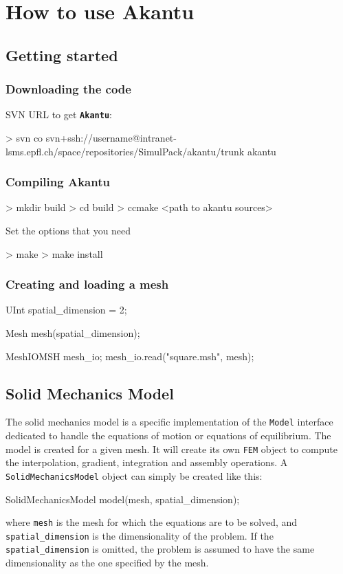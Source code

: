 \documentclass[a4paper,11pt]{book}
\newcommand{\akantu}{{\texttt{\textbf{Akantu}}}\xspace}
\newcommand{\code}[1]{\texttt{#1}}
\begin{document}
\chapter{How to use Akantu}
\section{Getting started}
\subsection{Downloading the code}
SVN URL to get \akantu :
\begin{command}
  > svn co svn+ssh://username@intranet-lsms.epfl.ch/space/repositories/SimulPack/akantu/trunk akantu
\end{command}

\subsection{Compiling Akantu}
\begin{command}
  > mkdir build
  > cd build
  > ccmake <path to akantu sources>
\end{command}

Set the options that you need

\begin{command}
  > make
  > make install
\end{command}

\subsection{Creating and loading a mesh\label{sect:common:mesh}}

\begin{cpp}
  UInt spatial_dimension = 2;

  Mesh mesh(spatial_dimension);

  MeshIOMSH mesh_io;
  mesh_io.read("square.msh", mesh);
\end{cpp}

\section{Solid Mechanics Model}

The  solid mechanics  model is  a  specific implementation  of the  \code{Model}
interface  dedicated  to  handle  the   equations  of  motion  or  equations  of
equilibrium. The  model is  created for a  given mesh.   It will create  its own
\code{FEM}  object  to  compute  the interpolation,  gradient,  integration  and
assembly operations.  A \code{SolidMechanicsModel}  object can simply be created
like this:
\begin{cpp}
  SolidMechanicsModel model(mesh, spatial_dimension);
\end{cpp}
where \code{mesh}  is the  mesh for which  the equations  are to be  solved, and
\code{spatial\_dimension}  is  the  dimensionality   of  the  problem.   If  the
\code{spatial\_dimension} is  omitted, the  problem is assumed  to have  the same
dimensionality as the one specified by the mesh.
\end{document}
